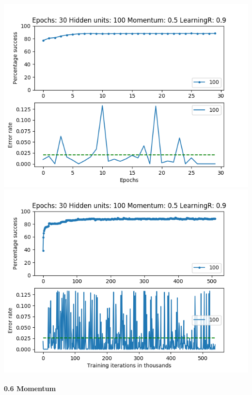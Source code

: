 \documentclass[11pt]{article}
\makeatletter
\def\maxwidth{\ifdim\Gin@nat@width>\linewidth\linewidth
    \else\Gin@nat@width\fi}
\let\Oldincludegraphics\includegraphics
\renewcommand{\includegraphics}[1]{\Oldincludegraphics[width=.8\maxwidth]{#1}}
\makeatother
\begin{document}
\includegraphics{Experiment2/E2_NN_Epoch_Momentum_0.5_30Epochs_100Hiddenunits.png}
\includegraphics{Experiment2/E2_NN_Training_Momentum_0.5_30Epochs_100Hiddenunits.png}

\hypertarget{momentum-6}{%
\paragraph{0.6 Momentum}\label{momentum-6}}
\end{document}
